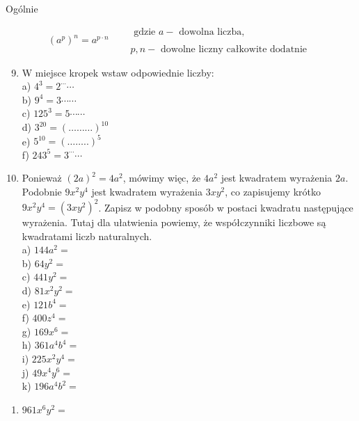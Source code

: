 \documentclass[10pt]{article}
\begin{document}
Ogólnie

\[
\left(a^{p}\right)^{n}=a^{p \cdot n} \quad \begin{aligned}
& \text { gdzie } a-\text { dowolna liczba, } \\
& \\
& p, n-\text { dowolne liczny całkowite dodatnie }
\end{aligned}
\]

\begin{enumerate}
  \setcounter{enumi}{8}
  \item W miejsce kropek wstaw odpowiednie liczby:\\
a) \(4^{3}=2^{\cdots} \cdots\)\\
b) \(9^{4}=3 \cdots \cdots\)\\
c) \(125^{3}=5 \cdots \cdots\)\\
d) \(3^{20}=(\ldots \ldots \ldots)^{10}\)\\
e) \(5^{10}=(\ldots \ldots . .)^{5}\)\\
f) \(243^{5}=3^{\cdots} \cdots\)
  \item Ponieważ \((2 a)^{2}=4 a^{2}\), mówimy więc, że \(4 a^{2}\) jest kwadratem wyrażenia \(2 a\). Podobnie \(9 x^{2} y^{4}\) jest kwadratem wyrażenia \(3 x y^{2}\), co zapisujemy krótko \(9 x^{2} y^{4}=\left(3 x y^{2}\right)^{2}\). Zapisz w podobny sposób w postaci kwadratu następujące wyrażenia. Tutaj dla ułatwienia powiemy, że współczynniki liczbowe są kwadratami liczb naturalnych.\\
a) \(144 a^{2}=\)\\
b) \(64 y^{2}=\)\\
c) \(441 y^{2}=\)\\
d) \(81 x^{2} y^{2}=\)\\
e) \(121 b^{4}=\)\\
f) \(400 z^{4}=\)\\
g) \(169 x^{6}=\)\\
h) \(361 a^{4} b^{4}=\)\\
i) \(225 x^{2} y^{4}=\)\\
j) \(49 x^{4} y^{6}=\)\\
k) \(196 a^{4} b^{2}=\)
\end{enumerate}

\begin{enumerate}
  \item \(961 x^{6} y^{2}=\)
\end{enumerate}
\end{document}

